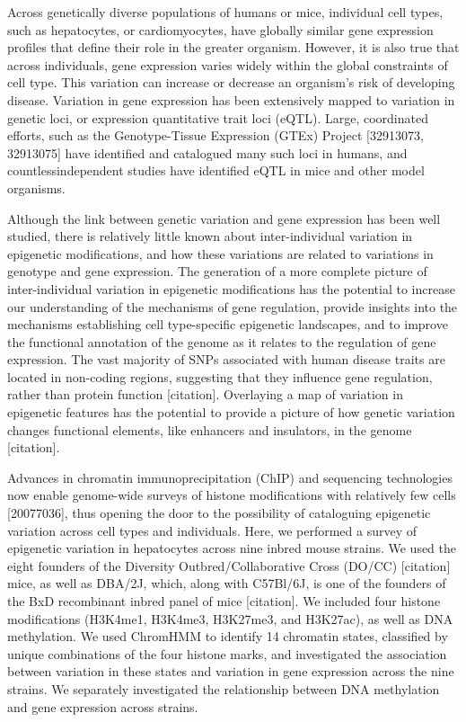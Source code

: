 \documentclass[10pt,letterpaper]{article}
\begin{document}
Across genetically diverse populations of humans or mice, individual
cell types, such as hepatocytes, or cardiomyocytes, have globally
similar gene expression profiles that define their role in the greater
organism. However, it is also true that across individuals, gene
expression varies widely within the global constraints of cell type.
This variation can increase or decrease an organism's risk of developing
disease. Variation in gene expression has been extensively mapped to
variation in genetic loci, or expression quantitative trait loci (eQTL).
Large, coordinated efforts, such as the Genotype-Tissue Expression
(GTEx) Project {[}32913073, 32913075{]} have identified and catalogued
many such loci in humans, and countlessindependent studies have
identified eQTL in mice and other model organisms.

Although the link between genetic variation and gene expression has been
well studied, there is relatively little known about inter-individual
variation in epigenetic modifications, and how these variations are
related to variations in genotype and gene expression. The generation of
a more complete picture of inter-individual variation in epigenetic
modifications has the potential to increase our understanding of the
mechanisms of gene regulation, provide insights into the mechanisms
establishing cell type-specific epigenetic landscapes, and to improve
the functional annotation of the genome as it relates to the regulation
of gene expression. The vast majority of SNPs associated with human
disease traits are located in non-coding regions, suggesting that they
influence gene regulation, rather than protein function {[}citation{]}.
Overlaying a map of variation in epigenetic features has the potential
to provide a picture of how genetic variation changes functional
elements, like enhancers and insulators, in the genome {[}citation{]}.

Advances in chromatin immunoprecipitation (ChIP) and sequencing
technologies now enable genome-wide surveys of histone modifications
with relatively few cells {[}20077036{]}, thus opening the door to the
possibility of cataloguing epigenetic variation across cell types and
individuals. Here, we performed a survey of epigenetic variation in
hepatocytes across nine inbred mouse strains. We used the eight founders
of the Diversity Outbred/Collaborative Cross (DO/CC) {[}citation{]}
mice, as well as DBA/2J, which, along with C57Bl/6J, is one of the
founders of the BxD recombinant inbred panel of mice {[}citation{]}. We
included four histone modifications (H3K4me1, H3K4me3, H3K27me3, and
H3K27ac), as well as DNA methylation. We used ChromHMM to identify 14
chromatin states, classified by unique combinations of the four histone
marks, and investigated the association between variation in these
states and variation in gene expression across the nine strains. We
separately investigated the relationship between DNA methylation and
gene expression across strains.
\end{document}
